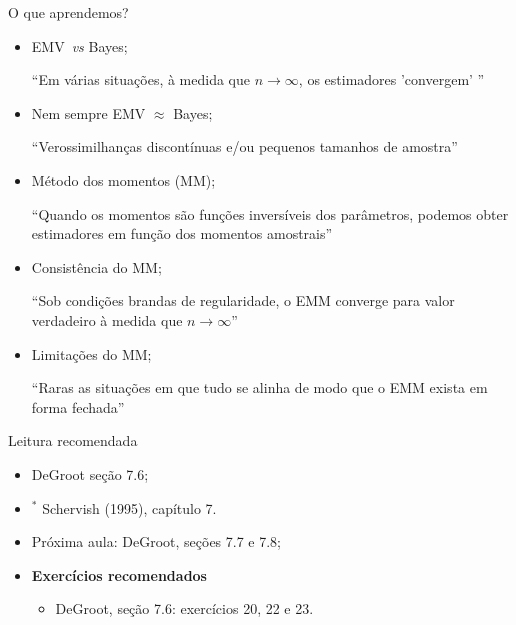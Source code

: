 \begin{frame}{O que aprendemos?}
\begin{itemize}
  \item[\faLightbulbO] EMV~\textit{vs} Bayes;
 
   ``Em várias situações, à medida que $n \to \infty$, os estimadores 'convergem' ''
  
  \item[\faLightbulbO] Nem sempre EMV $\approx$ Bayes;
 
   ``Verossimilhanças discontínuas e/ou pequenos tamanhos de amostra''
   
  \item[\faLightbulbO] Método dos momentos (MM);
  
  ``Quando os momentos são funções inversíveis dos parâmetros, podemos obter estimadores em função dos momentos amostrais''
  
    \item[\faLightbulbO] Consistência do MM;
  
  ``Sob condições brandas de regularidade, o EMM converge para valor verdadeiro à medida que $n \to \infty$''
  
    \item[\faLightbulbO] Limitações do MM;
  
  ``Raras as situações em que tudo se alinha de modo que o EMM exista em forma fechada''
  
  \end{itemize}
 \end{frame}

\begin{frame}{Leitura recomendada}
\begin{itemize}
 \item[\faBook] DeGroot seção 7.6;
 \item[\faBook] $^\ast$ Schervish (1995), capítulo 7.
 \item[\faForward] Próxima aula: DeGroot, seções 7.7 e 7.8;
 \item {\large\textbf{Exercícios recomendados}}
 \begin{itemize}
  \item[\faBookmark] DeGroot, seção 7.6: exercícios 20, 22 e 23. 
  \end{itemize}
 \end{itemize} 
\end{frame}
